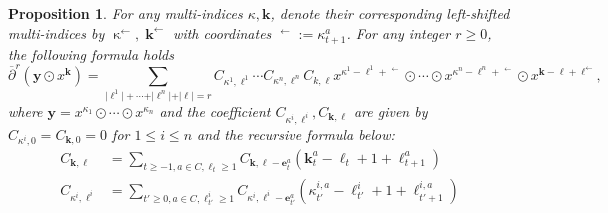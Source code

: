 \documentclass[10pt,a4paper]{amsart}
\newtheorem{proposition}{Proposition}
\def\shift#1{\mathop{#1}^{\leftarrow}\limits}
\begin{document}
\begin{proposition}
\label{prop:formula_partial_bar}
For any multi-indices $\kappa, \mathbf k$, denote their corresponding left-shifted multi-indices by $\shift{\kappa},\shift{\mathbf k}$ with coordinates $\shift{\kappa_t^a}:=\kappa_{t+1}^a$.
For any integer $r\geq 0$, the following formula holds
\[
    \overline{\partial}^r( \mathbf y\odot  x^{\mathbf k})=\sum_{\vert\ell^1\vert +\cdots + \vert\ell^n\vert + \vert\ell\vert=r}C_{\kappa^1, \ell^1}\cdots C_{\kappa^n, \ell^n}C_{ k, \ell} x^{\kappa^1 - \ell^1 + \shift{\ell^1}}\odot \cdots\odot   x^{\kappa^n - \ell^n + \shift{\ell^n}}\odot  x^{\mathbf k - \ell + \shift{\ell}},
\]
where $\mathbf y=x^{\kappa_1}\odot \cdots \odot x^{\kappa_n}$ and the coefficient $C_{\kappa^i, \ell^i}, C_{\mathbf k, \ell}$ are given by $C_{\kappa^i, 0}=C_{\mathbf k, 0}=0$ for $1 \le i\le n$ and the recursive formula below:
\begin{align*}
    C_{\mathbf k, \ell} & = \sum_{t\geq -1, a\in C, \ell_t\geq 1}C_{\mathbf k, \ell -\mathbf e_t^a}(\mathbf k_t^a - \ell_t + 1 + \ell_{t+1}^a)\\
C_{\kappa^i, \ell^i} & = \sum_{t'\geq 0, a\in C, \ell^i_{t'}\geq 1} C_{ \kappa^i, \ell^i-\mathbf e_{t'}^a}(\kappa^{i,a}_{t'} - \ell^i_{t'} + 1 + \ell^{i,a}_{t'+1})
\end{align*}
\end{proposition}
\end{document}
